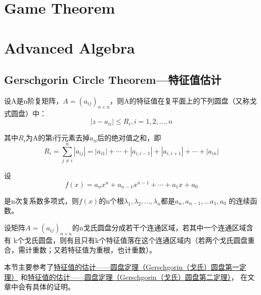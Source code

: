 \documentclass[lang=cn,10pt]{elegantbook}
\begin{document}
\chapter{Game Theorem}



\chapter{Advanced Algebra}
\section{Gerschgorin Circle Theorem—特征值估计\label{Gerschgorin}}
\begin{theorem}[圆盘第一定理]\label{Gerschgorin1}
	设A是n阶复矩阵，$A=(a_{ij})_{n \times n}$，则A的特征值在复平面上的下列圆盘（又称戈式圆盘）中：
	\begin{equation*}
		|z-a_{ii}|\leq R_i,i=1,2,\ldots,n
	\end{equation*}
	\par 其中$R_i$为A的第i行元素去掉$a_{ii}$后的绝对值之和，即
	\begin{equation*}
		R_i=\sum_{j\neq i}^n|a_{ij}|=|a_{i1}|+\cdots+|a_{i,i-1}|+|a_{i,i+1}|+\cdots+|a_{in}|
	\end{equation*}
\end{theorem}

\begin{lemma}
	设\begin{equation*}
		f(x)=a_nx^n+a_{n-1}x^{n-1}+\cdots+a_1x+a_0
	\end{equation*}
	\par 是n次复系数多项式，则$f(x)$的n个根$\lambda_{1},\lambda_{2},\ldots,\lambda_{n}$都是$a_n,a_{n-1},\ldots a_1,a_0$
	的连续函数。
\end{lemma}

\begin{theorem}[圆盘第二定理]
	设矩阵$A=(a_{ij})_{n \times n}$的n戈氏圆盘分成若干个连通区域，若其中一个连通区域含有
	k个戈氏圆盘，则有且只有k个特征值落在这个连通区域内（若两个戈氏圆盘重合，需计重数；又若特征值为重根，也计重数）。
\end{theorem}

本节主要参考了\href{https://zhuanlan.zhihu.com/p/418915975}{特征值的估计——圆盘定理（Gerschgorin（戈氏）圆盘第一定理）}
和\href{https://zhuanlan.zhihu.com/p/419195345}{特征值的估计——圆盘定理（Gerschgorin（戈氏）圆盘第二定理）}，
在文章中会有具体的证明。
\end{document}
